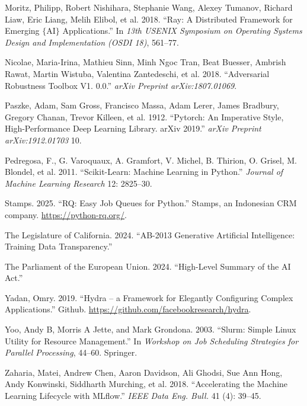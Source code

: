 \documentclass[
]{article}
\newlength{\cslhangindent}
\newlength{\cslentryspacingunit} %
\newenvironment{CSLReferences}[2] %
 {%
  \setlength{\parindent}{0pt}
  \ifodd #1
  \let\oldpar\par
  \def\par{\hangindent=\cslhangindent\oldpar}
  \fi
  \setlength{\parskip}{#2\cslentryspacingunit}
 }%
 {}
\begin{document}
\begin{CSLReferences}{1}{0}
\leavevmode{}%
Moritz, Philipp, Robert Nishihara, Stephanie Wang, Alexey Tumanov,
Richard Liaw, Eric Liang, Melih Elibol, et al. 2018. {``Ray: A
Distributed Framework for Emerging \(\{\)AI\(\}\) Applications.''} In
\emph{13th USENIX Symposium on Operating Systems Design and
Implementation (OSDI 18)}, 561--77.

\leavevmode{}%
Nicolae, Maria-Irina, Mathieu Sinn, Minh Ngoc Tran, Beat Buesser,
Ambrish Rawat, Martin Wistuba, Valentina Zantedeschi, et al. 2018.
{``Adversarial Robustness Toolbox V1. 0.0.''} \emph{arXiv Preprint
arXiv:1807.01069}.

\leavevmode{}%
Paszke, Adam, Sam Gross, Francisco Massa, Adam Lerer, James Bradbury,
Gregory Chanan, Trevor Killeen, et al. 1912. {``Pytorch: An Imperative
Style, High-Performance Deep Learning Library. arXiv 2019.''}
\emph{arXiv Preprint arXiv:1912.01703} 10.

\leavevmode{}%
Pedregosa, F., G. Varoquaux, A. Gramfort, V. Michel, B. Thirion, O.
Grisel, M. Blondel, et al. 2011. {``Scikit-Learn: Machine Learning in
{P}ython.''} \emph{Journal of Machine Learning Research} 12: 2825--30.

\leavevmode{}%
Stamps. 2025. {``RQ: Easy Job Queues for Python.''} Stamps, an
Indonesian CRM company. \url{https://python-rq.org/}.

\leavevmode{}%
The Legislature of California. 2024. {``AB-2013 Generative Artificial
Intelligence: Training Data Transparency.''}

\leavevmode{}%
The Parliament of the European Union. 2024. {``High-Level Summary of the
AI Act.''}

\leavevmode{}%
Yadan, Omry. 2019. {``Hydra -- a Framework for Elegantly Configuring
Complex Applications.''} Github.
\url{https://github.com/facebookresearch/hydra}.

\leavevmode{}%
Yoo, Andy B, Morris A Jette, and Mark Grondona. 2003. {``Slurm: Simple
Linux Utility for Resource Management.''} In \emph{Workshop on Job
Scheduling Strategies for Parallel Processing}, 44--60. Springer.

\leavevmode{}%
Zaharia, Matei, Andrew Chen, Aaron Davidson, Ali Ghodsi, Sue Ann Hong,
Andy Konwinski, Siddharth Murching, et al. 2018. {``Accelerating the
Machine Learning Lifecycle with MLflow.''} \emph{IEEE Data Eng. Bull.}
41 (4): 39--45.

\end{CSLReferences}
\end{document}
